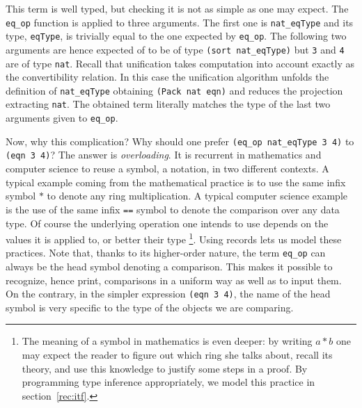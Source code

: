 This term is well typed, but checking it is not as simple as one may
expect.
The \lstinline/eq_op/ function is applied to three arguments.
The first one is \lstinline/nat_eqType/ and its type,
\lstinline/eqType/, is trivially equal to the one expected by
\lstinline/eq_op/.
The following two arguments are hence expected of to be of type
\lstinline/(sort nat_eqType)/ but \lstinline/3/ and \lstinline/4/ are
of type \lstinline/nat/.
Recall that unification takes computation into account exactly as the
convertibility relation.  In this case the unification algorithm
unfolds the definition of \lstinline/nat_eqType/ obtaining
\lstinline/(Pack nat eqn)/ and reduces the projection
extracting  \lstinline/nat/.  The obtained term literally matches the
type of the last two arguments given to \lstinline/eq_op/.

Now, why this complication?  Why should one prefer
\lstinline/(eq_op nat_eqType 3 4)/ to \lstinline/(eqn 3 4)/?
The answer is \emph{overloading}.
It is recurrent in mathematics and computer science to reuse
a symbol, a notation, in two different contexts.  A typical
example coming from the mathematical practice is to use the same
infix symbol $*$ to denote any ring multiplication.  A typical
computer science example is the use of the same infix
\lstinline/==/ symbol to denote the comparison over any data type.
Of course the underlying operation one intends to use depends on
the values it is applied to, or better their type
\footnote{The meaning of a symbol in mathematics is even deeper: by
	writing $a * b$ one may expect the reader to figure out which
	ring she talks about, recall its theory, and use this
	knowledge to justify some steps in a proof.  By programming type
	inference appropriately, we model this practice
in section~\ref{rec:itf}.}.
Using records lets us model these practices.
Note that, thanks to its higher-order nature, the term \lstinline/eq_op/
can always be the head symbol denoting a comparison.  This makes
it possible to recognize, hence print, comparisons in a uniform way
as well as to input them.  On the contrary, in the simpler expression
\lstinline/(eqn 3 4)/, the name of the head symbol is very specific to
the type of the objects we are comparing.


